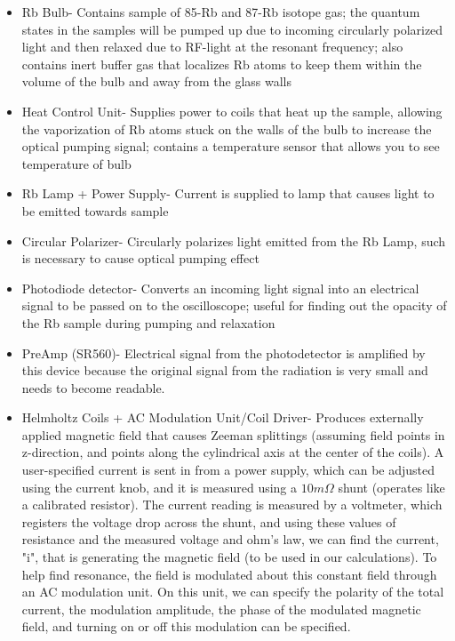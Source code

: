 \documentclass{article}
\begin{document}
    \begin{itemize}
        \item Rb Bulb- Contains sample of 85-Rb and 87-Rb isotope gas; the quantum states in the samples will be pumped up due to incoming circularly polarized light and then relaxed due to RF-light at the resonant frequency; also contains inert buffer gas that localizes Rb atoms to keep them within the volume of the bulb and away from the glass walls
        \item Heat Control Unit- Supplies power to coils that heat up the sample, allowing the vaporization of Rb atoms stuck on the walls of the bulb to increase the optical pumping signal; contains a temperature sensor that allows you to see temperature of bulb
        \item Rb Lamp + Power Supply- Current is supplied to lamp that causes light to be emitted towards sample
        \item Circular Polarizer- Circularly polarizes light emitted from the Rb Lamp, such is necessary to cause optical pumping effect
        \item Photodiode detector- Converts an incoming light signal into an electrical signal to be passed on to the oscilloscope; useful for finding out the opacity of the Rb sample during pumping and relaxation
        \item PreAmp (SR560)- Electrical signal from the photodetector is amplified by this device because the original signal from the radiation is very small and needs to become readable. 
        \item Helmholtz Coils + AC Modulation Unit/Coil Driver- Produces externally applied magnetic field that causes Zeeman splittings (assuming field points in z-direction, and points along the cylindrical axis at the center of the coils). A user-specified current is sent in from a power supply, which can be adjusted using the current knob, and it is measured using a $10m\Omega$ shunt (operates like a calibrated resistor). The current reading is measured by a voltmeter, which registers the voltage drop across the shunt, and using these values of resistance and the measured voltage and ohm's law, we can find the current, "i", that is generating the magnetic field (to be used in our calculations). To help find resonance, the field is modulated about this constant field through an AC modulation unit. On this unit, we can specify the polarity of the total current, the modulation amplitude, the phase of the modulated magnetic field, and turning on or off this modulation can be specified. 

\end{itemize}
\end{document}
